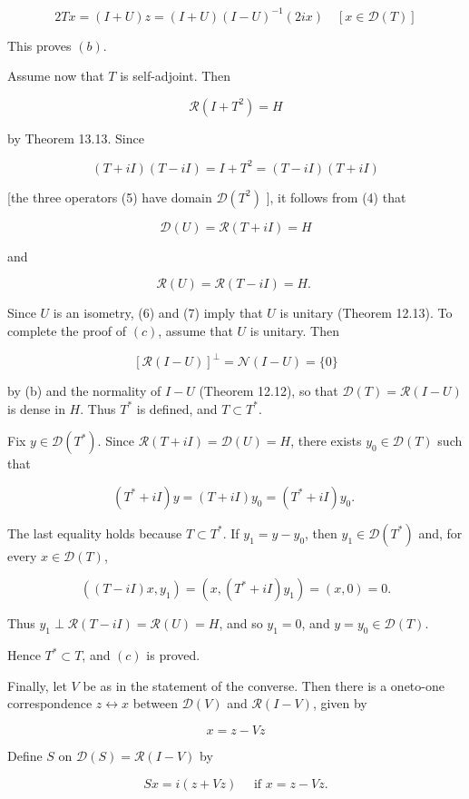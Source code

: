 \documentclass[10pt]{article}
\begin{document}
$$
2 T x=(I+U) z=(I+U)(I-U)^{-1}(2 i x) \quad[x \in \mathscr{D}(T)]
$$

This proves $(b)$.

Assume now that $T$ is self-adjoint. Then

$$
\mathscr{R}\left(I+T^{2}\right)=H
$$

by Theorem 13.13. Since

$$
(T+i I)(T-i I)=I+T^{2}=(T-i I)(T+i I)
$$

[the three operators (5) have domain $\mathscr{D}\left(T^{2}\right)$ ], it follows from (4) that

$$
\mathscr{D}(U)=\mathscr{R}(T+i I)=H
$$

and

$$
\mathscr{R}(U)=\mathscr{R}(T-i I)=H \text {. }
$$

Since $U$ is an isometry, (6) and (7) imply that $U$ is unitary (Theorem 12.13). To complete the proof of $(c)$, assume that $U$ is unitary. Then

$$
[\mathscr{R}(I-U)]^{\perp}=\mathscr{N}(I-U)=\{0\}
$$

by (b) and the normality of $I-U$ (Theorem 12.12), so that $\mathscr{D}(T)=\mathscr{R}(I-U)$ is dense in $H$. Thus $T^{*}$ is defined, and $T \subset T^{*}$.

Fix $y \in \mathscr{D}\left(T^{*}\right)$. Since $\mathscr{R}(T+i I)=\mathscr{D}(U)=H$, there exists $y_{0} \in \mathscr{D}(T)$ such that

$$
\left(T^{*}+i I\right) y=(T+i I) y_{0}=\left(T^{*}+i I\right) y_{0} \text {. }
$$

The last equality holds because $T \subset T^{*}$. If $y_{1}=y-y_{0}$, then $y_{1} \in \mathscr{D}\left(T^{*}\right)$ and, for every $x \in \mathscr{D}(T)$,

$$
\left((T-i I) x, y_{1}\right)=\left(x,\left(T^{*}+i I\right) y_{1}\right)=(x, 0)=0 .
$$

Thus $y_{1} \perp \mathscr{R}(T-i I)=\mathscr{R}(U)=H$, and so $y_{1}=0$, and $y=y_{0} \in \mathscr{D}(T)$.

Hence $T^{*} \subset T$, and $(c)$ is proved.

Finally, let $V$ be as in the statement of the converse. Then there is a oneto-one correspondence $z \leftrightarrow x$ between $\mathscr{D}(V)$ and $\mathscr{R}(I-V)$, given by

$$
x=z-V z
$$

Define $S$ on $\mathscr{D}(S)=\mathscr{R}(I-V)$ by

$$
S x=i(z+V z) \quad \text { if } x=z-V z .
$$
\end{document}
